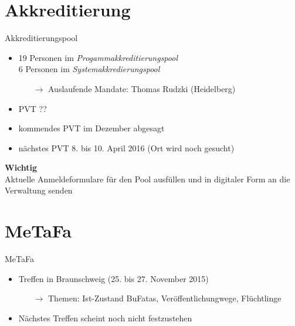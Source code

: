 \documentclass[compress,]{beamer}
\begin{document}
\section{Akkreditierung}

\begin{frame}{Akkreditierungspool}
	\begin{itemize}
		\item 19 Personen im \emph{Progammakkreditierungspool}\\
			6 Personen im \emph{Systemakkredierungspool}
			\begin{itemize}
				\item[$\rightarrow$] Auslaufende Mandate: Thomas Rudzki (Heidelberg)
			\end{itemize}
		\item PVT ??
		\item kommendes PVT im Dezember abgesagt
		\item nächstes PVT 8. bis 10. April 2016 (Ort wird noch gesucht)
	\end{itemize}
\end{frame}

\begin{frame}
	\begin{framed}
		\begin{center}
			{\Huge \textbf{Wichtig}}\\
			\vspace{0.5cm}
			{\Large Aktuelle Anmeldeformulare für den Pool ausfüllen und in digitaler Form an die Verwaltung senden}
		\end{center}
	\end{framed}
\end{frame}

\section{MeTaFa}

\begin{frame}{MeTaFa}
	\begin{itemize}
		\item Treffen in Braunschweig (25. bis 27. November 2015)
			\begin{itemize}
				\item[$\rightarrow$] Themen: Ist-Zustand BuFatas, Veröffentlichungwege, Flüchtlinge
			\end{itemize}
		\item Nächstes Treffen scheint noch nicht festzustehen
	\end{itemize}
\end{frame}
\end{document}

